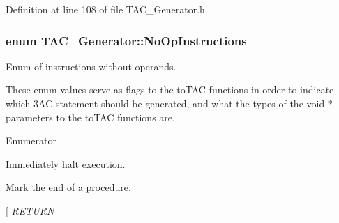 Definition at line 108 of file T\-A\-C\-\_\-\-Generator.\-h.

\hypertarget{classTAC__Generator_a3942f3e280fb83e44ad85eb13d56dfb5}{
\subsubsection[{No\-Op\-Instructions}]{\setlength{\rightskip}{0pt plus 5cm}enum {\bf T\-A\-C\-\_\-\-Generator\-::\-No\-Op\-Instructions}}}\label{classTAC__Generator_a3942f3e280fb83e44ad85eb13d56dfb5}


Enum of instructions without operands. 

These enum values serve as flags to the to\-T\-A\-C functions in order to indicate which 3\-A\-C statement should be generated, and what the types of the void $\ast$ parameters to the to\-T\-A\-C functions are. \begin{Desc}
\item[Enumerator]\par
\begin{description}
\item[{\em 
\hypertarget{classTAC__Generator_a3942f3e280fb83e44ad85eb13d56dfb5a8e16b137fe321cada85cb3ab596934f7}{H\-A\-L\-T}\label{classTAC__Generator_a3942f3e280fb83e44ad85eb13d56dfb5a8e16b137fe321cada85cb3ab596934f7}
}]Immediately halt execution. \item[{\em 
\hypertarget{classTAC__Generator_a3942f3e280fb83e44ad85eb13d56dfb5ab8cc9678456e68db56838ba762eb03cf}{E\-N\-D\-P\-R\-O\-C}\label{classTAC__Generator_a3942f3e280fb83e44ad85eb13d56dfb5ab8cc9678456e68db56838ba762eb03cf}
}]Mark the end of a procedure. \item[{\em 
\hypertarget{classTAC__Generator_a3942f3e280fb83e44ad85eb13d56dfb5a0e868fa94bac0750a62dfa98d0f56510}{R\-E\-T\-U\-R\-N}\label{classTAC__Generator_a3942f3e280fb83e44ad85eb13d56dfb5a0e868fa94bac0750a62dfa98d0f56510}
}
\end{description}
\end{Desc}
